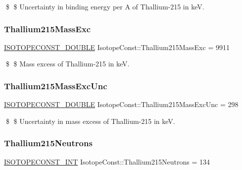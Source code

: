 \$ \$ Uncertainty in binding energy per A of Thallium-\/215 in keV. \mbox{\label{group___isotope_const-_thallium-_tl215_ga3028ffd997828236f8601bfa52dea279}} 
\subsubsection{\texorpdfstring{Thallium215\+Mass\+Exc}{Thallium215MassExc}}
{\footnotesize\ttfamily \mbox{\hyperlink{group___isotope_const-_macros_ga8f45a7272ce02c0b4c65c44636ed719a}{I\+S\+O\+T\+O\+P\+E\+C\+O\+N\+S\+T\+\_\+\+D\+O\+U\+B\+LE}} Isotope\+Const\+::\+Thallium215\+Mass\+Exc = 9911}

\$ \$ Mass excess of Thallium-\/215 in keV. \mbox{\label{group___isotope_const-_thallium-_tl215_ga58c94fe376da09ca1f505a4d8035a329}} 
\subsubsection{\texorpdfstring{Thallium215\+Mass\+Exc\+Unc}{Thallium215MassExcUnc}}
{\footnotesize\ttfamily \mbox{\hyperlink{group___isotope_const-_macros_ga8f45a7272ce02c0b4c65c44636ed719a}{I\+S\+O\+T\+O\+P\+E\+C\+O\+N\+S\+T\+\_\+\+D\+O\+U\+B\+LE}} Isotope\+Const\+::\+Thallium215\+Mass\+Exc\+Unc = 298}

\$ \$ Uncertainty in mass excess of Thallium-\/215 in keV. \mbox{\label{group___isotope_const-_thallium-_tl215_gacdec4c03e0c0541a6b7e3928c04238e9}} 
\subsubsection{\texorpdfstring{Thallium215\+Neutrons}{Thallium215Neutrons}}
{\footnotesize\ttfamily \mbox{\hyperlink{group___isotope_const-_macros_ga5f18360b3e99483a35c32d789e62621c}{I\+S\+O\+T\+O\+P\+E\+C\+O\+N\+S\+T\+\_\+\+I\+NT}} Isotope\+Const\+::\+Thallium215\+Neutrons = 134}

